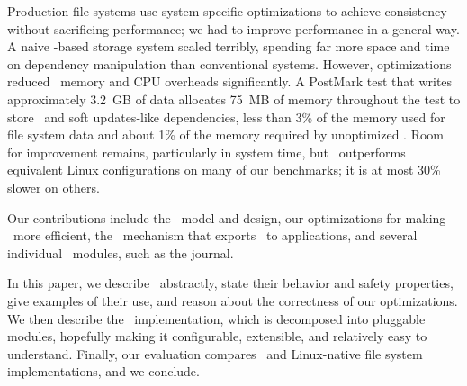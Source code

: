 Production file systems use system-specific optimizations to achieve
 consistency without sacrificing performance; we had to improve
 performance in a general way.
%
A naive \patch-based storage system scaled terribly,
 spending far more space and time on dependency manipulation than
 conventional systems.
%
However, optimizations reduced \patch\ memory and
 CPU overheads significantly.
%
A PostMark test that writes approximately 3.2~GB of data
 allocates 75~MB of memory throughout the test to store \patches\ and
 soft updates-like dependencies, less than 3\% of the memory used for file
 system data and about 1\% of the memory required by unoptimized
 \Featherstitch.
%
Room for improvement remains, particularly in system time, but
 \Featherstitch\ outperforms equivalent Linux configurations on
 many of our benchmarks; it is at most 30\% slower on others.


Our contributions include the \patch\ model and design, our
 optimizations for making \patches\ more efficient,
 the \patchgroup\ mechanism that exports
 \patches\ to applications, and several individual \Kudos\ modules, such as
 the journal.


In this paper, we describe \patches\ abstractly, state their behavior and safety
 properties, give examples of their use, and reason about the
 correctness of our optimizations.
%
We then describe the \Kudos\ implementation, which is decomposed
 into pluggable modules, hopefully making it configurable,
 extensible, and relatively easy to understand.
%
Finally, our evaluation compares \Kudos\ and Linux-native file
 system implementations, and we conclude.




\begin{comment}
%
Our benchmarks show that our optimizations can reduce the number of
 \patches\ \Kudos\ creates by \patchoptcount\ and the amount of undo data
 memory it allocates by \patchoptundo.
%
Our prototype is not yet as fast as we would like, but it is competitive
 with Linux on many of our benchmarks.
\end{comment}
